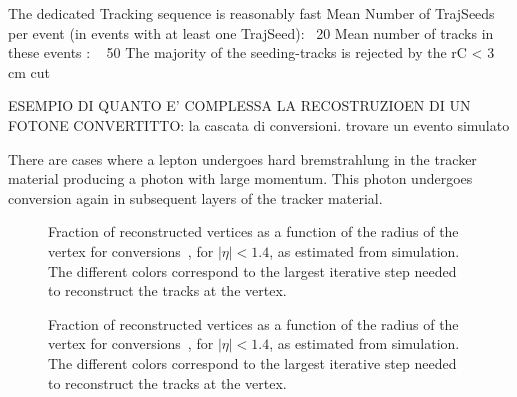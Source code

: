 \documentclass[a4paper]{jpconf}
\begin{document}
The dedicated Tracking sequence is reasonably fast 
Mean Number of TrajSeeds per event (in events with at least one TrajSeed): ~20
Mean number of tracks in these events : ~ 50
The majority of the seeding-tracks is rejected by the rC < 3 cm cut


ESEMPIO DI QUANTO E' COMPLESSA LA RECOSTRUZIOEN DI UN FOTONE CONVERTITTO: la cascata di conversioni. trovare un evento simulato

There are cases where a lepton undergoes hard bremstrahlung in the tracker material producing a photon with large momentum. This photon undergoes conversion again in subsequent layers of the tracker material.


\begin{figure}[h]
\centering
{}
\caption{Fraction of reconstructed vertices as a function of the radius of the vertex
for conversions~, for  $|\eta|<1.4$, as estimated
from simulation. The different colors correspond to the largest
iterative step needed to reconstruct the tracks at the vertex.}
\label{fig:barrelPerf}
\end{figure}

\begin{figure}[h]
\centering
{}
\caption{Fraction of reconstructed vertices as a function of the radius of the vertex
for conversions~, for  $|\eta|<1.4$, as estimated
from simulation. The different colors correspond to the largest
iterative step needed to reconstruct the tracks at the vertex.}
\label{fig:endcapPerf}
\end{figure}
\end{document}
